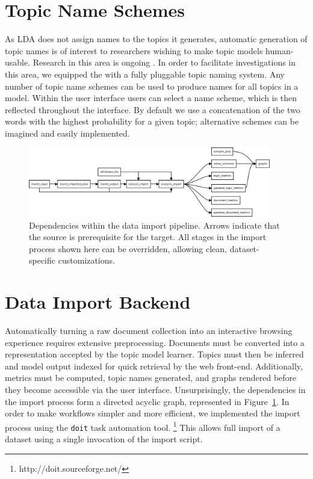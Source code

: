 \documentclass[11pt]{article}
\begin{document}
\section{Topic Name Schemes}
As LDA does not assign names to the topics it generates, automatic generation of
topic names is of interest to researchers wishing to make topic models
human-usable. Research in this area is ongoing \cite{Mei2007,Lau2010}. In order to
facilitate investigations in this area, we equipped the \tool{} with a
fully pluggable topic naming system. Any number of topic name schemes can be
used to produce names for all topics in a model. Within the user interface
users can select a name scheme, which is then reflected throughout the
interface. By default we use a concatenation of the two
words with the highest probability for a given topic; alternative schemes
can be imagined and easily implemented.%

\begin{figure}[ht]%
 \centering
 \includegraphics[width=400px,keepaspectratio=true]{./build_flowchart2.png}
 \caption{Dependencies within the data import pipeline. Arrows indicate that the source is prerequisite for the target.
All stages in the import process shown here can be overridden, allowing clean, dataset-specific customizations.}
 \label{fig:build_flowchart}
\end{figure}
\section{Data Import Backend}
Automatically turning a raw document collection into an interactive browsing
experience requires extensive preprocessing. Documents must be converted into a
representation accepted by the topic model learner. Topics must then be inferred
and model output indexed for quick retrieval by the web front-end.
Additionally, metrics must be computed, topic names generated, and graphs rendered
before they become accessible via the user interface. Unsurprisingly, the dependencies
in the import process form a directed acyclic graph, represented in Figure~\ref{fig:build_flowchart}.
In order to make workflows simpler and more efficient, we implemented
the import process using the \texttt{doit} task automation tool.
\footnote{http://doit.sourceforge.net/} This allows full
import of a dataset using a single invocation of the import script.
\end{document}
